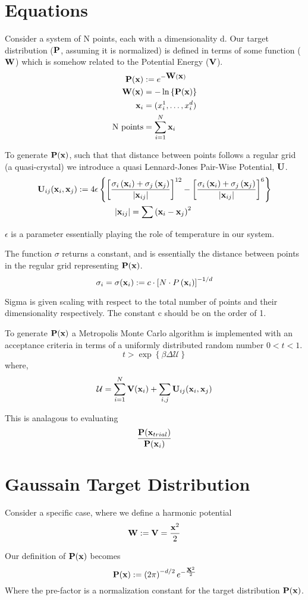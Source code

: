 \documentclass[preprint,showpacs,preprintnumbers,amsmath,amssymb]{revtex4}
\newcommand{\be}{\begin{equation}}
\newcommand{\ee}{\end{equation}}
\newcommand{\bx}{\mbox{\bf x}}
\newcommand{\bU}{\mbox{\bf U}}
\newcommand{\bV}{\mbox{\bf V}}
\newcommand{\bP}{\mbox{\bf P}}
\newcommand{\bW}{\mbox{\bf W}}
\newcommand{\uu}{\mathcal{U}}
\begin{document}
\section*{Equations}
Consider a system of N points, each with a dimensionality d.
Our target distribution ($\bP$, assuming it is normalized) is defined in terms of some function ($\bW$) which is somehow related to the Potential Energy ($\bV$).
\be
\begin{split}
    \bP(\bx)&:=e^{-\bW(\bx)}\\
    \bW(\bx)&=-\ln\left\{\bP(\bx)\right\}\\
    \bx_i&=(x_i^1,\ldots,x_i^d)\\
    \text{N points}&=\sum_{i=1}^N \bx_i
\end{split}
\ee

To generate $\bP(\bx)$, such that that distance between points follows a regular grid (a quasi-crystal) we introduce a quasi Lennard-Jones Pair-Wise Potential, $\bU$.
\be
\begin{split}
    \bU_{ij}(\bx_i,\bx_j):=4\epsilon &\left\{\left[\frac{\sigma_i\left(\bx_i\right)+\sigma_j\left(\bx_j\right)}{|\bx_{ij}|}\right]^{12} - \left[\frac{\sigma_i\left(\bx_i\right)+\sigma_j\left(\bx_j\right)}{|\bx_{ij}|}\right]^6 \right\}\\
    &\quad \quad |\bx_{ij}|=\sum\left(\bx_i-\bx_j\right)^2
\end{split}
\ee

$\epsilon$ is a parameter essentially playing the role of temperature in our system. 

The function $\sigma$ returns a constant, and is essentially the distance between points in the regular grid representing $\bP(\bx)$.
\be
\sigma_i=\sigma(\bx_i) := c\cdot \left[N\cdot P\left(\bx_i\right)\right]^{-1/d}
\ee

Sigma is given scaling with respect to the total number of points and their dimensionality respectively. 
The constant c should be on the order of 1.

To generate $\bP(\bx)$ a Metropolis Monte Carlo algorithm is implemented with an acceptance criteria in terms of a uniformly distributed random number $0 < t < 1$.
\be
t > \exp\left\{\beta \Delta \uu \right\}
\ee
where,
\be
\uu=\sum_{i=1}^N \bV(\bx_i) + \sum_{i,j}\bU_{ij}(\bx_i,\bx_j)
\ee

This is analagous to evaluating 
\be
\frac{\bP(\bx_{trial})}{\bP(\bx_i)}
\ee

\section*{Gaussain Target Distribution}
Consider a specific case, where we define a harmonic potential
\be
\bW:=\bV=\frac{\bx^2}{2}
\ee

Our definition of $\bP(\bx)$ becomes
\be
\bP(\bx):= \left(2\pi\right)^{-d/2}e^{-\frac{\bx^2}{2} }
\ee
Where the pre-factor is a normalization constant for the target distribution $\bP(\bx)$.
\end{document}
